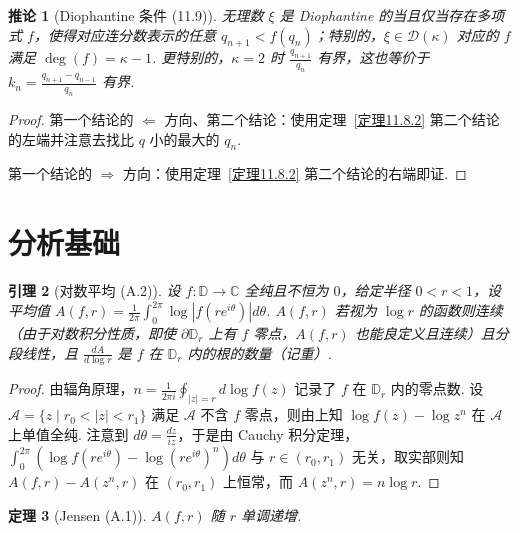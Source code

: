 \documentclass[11pt, a4paper, oneside]{ctexart}
\newtheorem{theorem}{定理}[section]
\newtheorem{corollary}[theorem]{推论}
\newtheorem{lemma}[theorem]{引理}
\newcommand{\C}{\mathbb{C}}
\newcommand{\D}{\mathbb{D}}
\newcommand{\cA}{\mathcal{A}}
\newcommand{\cD}{\mathcal{D}}
\newcommand{\abs}[1]{\left|{#1}\right|}
\begin{document}
    \begin{corollary}[Diophantine 条件 (11.9)]
        无理数 $\xi$ 是 Diophantine 的当且仅当存在多项式 $f$，使得对应连分数表示的任意 $q_{n+1}<f(q_n)$；特别的，$\xi\in\cD(\kappa)$ 对应的 $f$ 满足 $\deg(f)=\kappa-1$. 更特别的，$\kappa=2$ 时 $\frac{q_{n+1}}{q_n}$ 有界，这也等价于 $k_n=\frac{q_{n+1}-q_{n-1}}{q_n}$ 有界.
    \end{corollary}
    \begin{proof}
        第一个结论的 $\Leftarrow$ 方向、第二个结论：使用定理~\ref{定理11.8.2} 第二个结论的左端并注意去找比 $q$ 小的最大的 $q_n$.
        
        第一个结论的 $\Rightarrow$ 方向：使用定理~\ref{定理11.8.2} 第二个结论的右端即证.
    \end{proof}

    \section{分析基础}
    \begin{lemma}[对数平均 (A.2)]
        设 $f:\D\to \C$ 全纯且不恒为 $0$，给定半径 $0<r<1$，设平均值 $A(f,r)=\frac{1}{2\pi}\int_{0}^{2\pi}\log\abs{f(re^{i\theta})}d\theta$. $A(f,r)$ 若视为 $\log r$ 的函数则连续（由于对数积分性质，即使 $\partial \D_r$ 上有 $f$ 零点，$A(f,r)$ 也能良定义且连续）且分段线性，且 $\frac{dA}{d\log r}$ 是 $f$ 在 $\D_r$ 内的根的数量（记重）.
    \end{lemma}
    \begin{proof}
        由辐角原理，$n=\frac{1}{2\pi i}\oint_{\abs{z}=r}d\log f(z)$ 记录了 $f$ 在 $\D_r$ 内的零点数. 设 $\cA=\{z\mid r_0<\abs{z}<r_1\}$ 满足 $\cA$ 不含 $f$ 零点，则由上知 $\log f(z)-\log z^n$ 在 $\cA$ 上单值全纯. 注意到 $d\theta=\frac{dz}{iz}$，于是由 Cauchy 积分定理，$\int_{0}^{2\pi}(\log f(re^{i\theta})-\log {(re^{i\theta})}^n)d\theta$ 与 $r\in (r_0,r_1)$ 无关，取实部则知 $A(f,r)-A(z^n,r)$ 在 $(r_0,r_1)$ 上恒常，而 $A(z^n,r)=n\log r$.
    \end{proof}

    \begin{theorem}[Jensen (A.1)]\label{定理A.1}
        $A(f,r)$ 随 $r$ 单调递增.
    \end{theorem}
\end{document}
